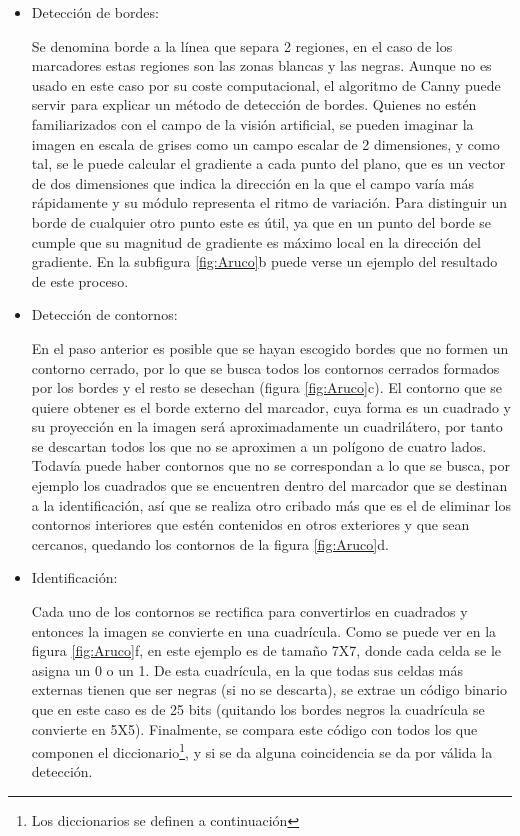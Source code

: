 \begin{itemize}
\item Detección de bordes: 

	Se denomina borde a la línea que separa 2 regiones, en el caso de los marcadores estas regiones son las zonas blancas y las negras. Aunque no es usado  en este caso por su coste computacional, el algoritmo de Canny puede servir para explicar un método de detección de bordes. 
	Quienes no estén familiarizados con el campo de la visión artificial, se pueden imaginar la imagen en escala de grises como un campo escalar de 2 dimensiones, y como tal, se le puede calcular el gradiente a cada punto del plano, que es un vector de dos dimensiones que indica la dirección en la que el campo varía más rápidamente y su módulo representa el ritmo de variación. Para distinguir un borde de cualquier otro punto este es útil, ya que en un punto del borde se cumple que su magnitud de gradiente es máximo local en la dirección del gradiente. En la subfigura \ref{fig:Aruco}{b} puede verse un ejemplo del resultado de este proceso.

\item Detección de contornos:

	En el paso anterior es posible que se hayan escogido bordes que no formen un contorno cerrado, por lo que se busca todos los contornos cerrados formados por los bordes y el resto se desechan (figura \mbox{\ref{fig:Aruco}c}). 
	El contorno que se quiere obtener es el borde externo del marcador, cuya forma es un cuadrado y su proyección en la imagen será aproximadamente un cuadrilátero, por tanto se descartan todos los que no se aproximen a un polígono de cuatro lados. Todavía puede haber contornos que no se correspondan a lo que se busca, por ejemplo los cuadrados que se encuentren dentro del marcador que se destinan a la identificación, así que se realiza otro cribado más que es el de eliminar los contornos interiores que estén contenidos en otros exteriores y que sean cercanos, quedando los contornos de la figura \mbox{\ref{fig:Aruco}d}. 
	
\item Identificación: 

	Cada uno de los contornos se rectifica para convertirlos en cuadrados y entonces la imagen se convierte en una cuadrícula. Como se puede ver en la figura \ref{fig:Aruco}{f}, en este ejemplo es de tamaño 7X7, donde cada celda se le asigna un 0 o un 1. De esta cuadrícula, en la que todas sus celdas más externas tienen que ser negras (si no se descarta), se extrae un código binario que en este caso es de 25 bits (quitando los bordes negros la cuadrícula se convierte en 5X5). Finalmente, se compara este código con todos los que componen el diccionario\footnote{Los diccionarios se definen a continuación}, y si se da alguna coincidencia se da por válida la detección.   
\end{itemize}

